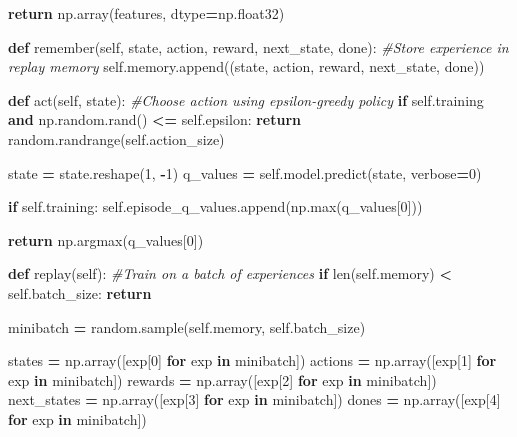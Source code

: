 \documentclass[12pt]{article}
\newenvironment{Shaded}{\begin{snugshade}}{\end{snugshade}}
\newcommand{\BuiltInTok}[1]{#1}
\newcommand{\CommentTok}[1]{\textcolor[rgb]{0.56,0.35,0.01}{\textit{#1}}}
\newcommand{\ControlFlowTok}[1]{\textcolor[rgb]{0.13,0.29,0.53}{\textbf{#1}}}
\newcommand{\DecValTok}[1]{\textcolor[rgb]{0.00,0.00,0.81}{#1}}
\newcommand{\KeywordTok}[1]{\textcolor[rgb]{0.13,0.29,0.53}{\textbf{#1}}}
\newcommand{\NormalTok}[1]{#1}
\newcommand{\OperatorTok}[1]{\textcolor[rgb]{0.81,0.36,0.00}{\textbf{#1}}}
\newcommand{\VariableTok}[1]{\textcolor[rgb]{0.00,0.00,0.00}{#1}}
\begin{document}
\begin{thesis}
\begin{Shaded}
\begin{Highlighting}[]
        \ControlFlowTok{return}\NormalTok{ np.array(features, dtype}\OperatorTok{=}\NormalTok{np.float32)}
    
    \KeywordTok{def}\NormalTok{ remember(}\VariableTok{self}\NormalTok{, state, action, reward, next\_state, done):}
        \CommentTok{\#Store experience in replay memory}
        \VariableTok{self}\NormalTok{.memory.append((state, action, reward, next\_state, done))}
    
    \KeywordTok{def}\NormalTok{ act(}\VariableTok{self}\NormalTok{, state):}
        \CommentTok{\#Choose action using epsilon{-}greedy policy}
        \ControlFlowTok{if} \VariableTok{self}\NormalTok{.training }\KeywordTok{and}\NormalTok{ np.random.rand() }\OperatorTok{\textless{}=} \VariableTok{self}\NormalTok{.epsilon:}
            \ControlFlowTok{return}\NormalTok{ random.randrange(}\VariableTok{self}\NormalTok{.action\_size)}
        
\NormalTok{        state }\OperatorTok{=}\NormalTok{ state.reshape(}\DecValTok{1}\NormalTok{, }\OperatorTok{{-}}\DecValTok{1}\NormalTok{)}
\NormalTok{        q\_values }\OperatorTok{=} \VariableTok{self}\NormalTok{.model.predict(state, verbose}\OperatorTok{=}\DecValTok{0}\NormalTok{)}

        \ControlFlowTok{if} \VariableTok{self}\NormalTok{.training:}
            \VariableTok{self}\NormalTok{.episode\_q\_values.append(np.}\BuiltInTok{max}\NormalTok{(q\_values[}\DecValTok{0}\NormalTok{]))}

        \ControlFlowTok{return}\NormalTok{ np.argmax(q\_values[}\DecValTok{0}\NormalTok{])}
    
    \KeywordTok{def}\NormalTok{ replay(}\VariableTok{self}\NormalTok{):}
        \CommentTok{\#Train on a batch of experiences}
        \ControlFlowTok{if} \BuiltInTok{len}\NormalTok{(}\VariableTok{self}\NormalTok{.memory) }\OperatorTok{\textless{}} \VariableTok{self}\NormalTok{.batch\_size:}
            \ControlFlowTok{return}
        
\NormalTok{        minibatch }\OperatorTok{=}\NormalTok{ random.sample(}\VariableTok{self}\NormalTok{.memory, }\VariableTok{self}\NormalTok{.batch\_size)}
        
\NormalTok{        states }\OperatorTok{=}\NormalTok{ np.array([exp[}\DecValTok{0}\NormalTok{] }\ControlFlowTok{for}\NormalTok{ exp }\KeywordTok{in}\NormalTok{ minibatch])}
\NormalTok{        actions }\OperatorTok{=}\NormalTok{ np.array([exp[}\DecValTok{1}\NormalTok{] }\ControlFlowTok{for}\NormalTok{ exp }\KeywordTok{in}\NormalTok{ minibatch])}
\NormalTok{        rewards }\OperatorTok{=}\NormalTok{ np.array([exp[}\DecValTok{2}\NormalTok{] }\ControlFlowTok{for}\NormalTok{ exp }\KeywordTok{in}\NormalTok{ minibatch])}
\NormalTok{        next\_states }\OperatorTok{=}\NormalTok{ np.array([exp[}\DecValTok{3}\NormalTok{] }\ControlFlowTok{for}\NormalTok{ exp }\KeywordTok{in}\NormalTok{ minibatch])}
\NormalTok{        dones }\OperatorTok{=}\NormalTok{ np.array([exp[}\DecValTok{4}\NormalTok{] }\ControlFlowTok{for}\NormalTok{ exp }\KeywordTok{in}\NormalTok{ minibatch])}
        

\end{Highlighting}
\end{Shaded}
\end{thesis}
\end{document}
